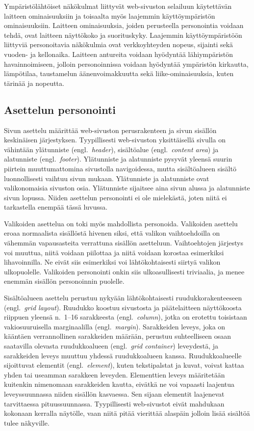 \documentclass[finnish, 12pt, a4paper, elec, utf8, a-1b, online]{aaltothesis}
\begin{document}
Ympäristölähtöiset näkökulmat liittyvät web-sivuston selailuun käytettävän
laitteen ominaisuuksiin ja toisaalta myös laajemmin käyttöympäristön
ominaisuuksiin. Laitteen ominaisuuksia, joiden perusteella personointia voidaan
tehdä, ovat laitteen näyttökoko ja suorituskyky. Laajemmin käyttöympäristöön
liittyviä personoitavia näkökulmia ovat verkkoyhteyden nopeus, sijainti sekä
vuoden- ja kellonaika. Laitteen antureita voidaan hyödyntää lähiympäristön
havainnoimiseen, jolloin personoinnissa voidaan hyödyntää ympäristön kirkautta,
lämpötilaa, taustamelun äänenvoimakkuutta sekä liike-ominaisuuksia, kuten
tärinää ja nopeutta.

\subsection{Asettelun personointi}\label{layout-personalization}

Sivun asettelu määrittää web-sivuston perusrakenteen ja sivun sisällön
keskinäisen järjestyksen. Tyypillisesti web-sivuston yksittäisellä sivulla on
vähintään ylätunniste (engl.~\textit{header}), sisältöalue
(engl.~\textit{content area}) ja alatunniste (engl.~\textit{footer}).
Ylätunniste ja alatunniste pysyvät yleensä suurin piirtein muuttumattomina
sivustolla navigoidessa, mutta sisältöalueen sisältö luonnollisesti vaihtuu
sivun mukaan. Ylätunniste ja alatunniste ovat valikonomaisia sivuston osia.
Ylätunniste sijaitsee aina sivun alussa ja alatunniste sivun lopussa. Niiden
asettelun personointi ei ole mielekästä, joten niitä ei tarkastella enempää
tässä luvussa.

Valikoiden asettelua on toki myös mahdollista personoida. Valikoiden asettelu
eroaa normaalista sisällöstä hivenen siksi, että valikon vaihtoehdoilla on
vähemmän vapausasteita verrattuna sisällön asetteluun. Vaihtoehtojen järjestys
voi muuttua, niitä voidaan piilottaa ja niitä voidaan korostaa esimerkiksi
lihavoinnilla. Ne eivät siis esimerkiksi voi lähtökohtaisesti siirtyä valikon
ulkopuolelle. Valikoiden personointi onkin siis ulkoasullisesti triviaalia, ja
menee enemmän sisällön personoinnin puolelle.

Sisältöalueen asettelu perustuu nykyään lähtökohtaisesti ruudukkorakenteeseen
(engl.~\textit{grid layout}). Ruudukko koostuu sivustosta ja päätelaitteen
näyttökoosta riippuen yleensä n.~1--16 sarakkeesta (engl.~\textit{column}),
jotka on erotettu toisistaan vakiosuuruisella marginaalilla
(engl.~\textit{margin}). Sarakkeiden leveys, joka on kääntäen verrannollinen
sarakkeiden määrään, perustuu suhteelliseen osaan saatavilla olevasta
ruudukkoalueen (engl.~\textit{grid container}) leveydestä, ja sarakkeiden leveys
muuttuu yhdessä ruudukkoalueen kanssa. Ruudukkoalueelle sijoittuvat elementit
(engl.~\textit{element}), kuten tekstipalstat ja kuvat, voivat kattaa yhden tai
useamman sarakkeen leveyden. Elementtien leveys määritetään kuitenkin nimenomaan
sarakkeiden kautta, eivätkä ne voi vapaasti laajentua leveyssuunnassa niiden
sisällön kasvaessa. Sen sijaan elementit laajenevat tarvittaessa
pituussuunnassa. Tyypillisesti web-sivustot eivät mahdukaan kokonaan kerralla
näytölle, vaan niitä pitää vierittää alaspäin jolloin lisää sisältöä tulee
näkyville.
\end{document}
